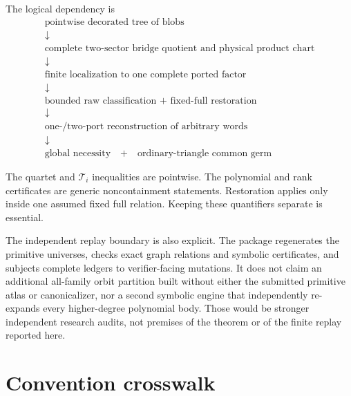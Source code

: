 \documentclass[11pt]{article}
\theoremstyle{remark}
\newcommand{\Ti}{\mathcal T_i}
\begin{document}
The logical dependency is
\[
\begin{array}{c}
\text{pointwise decorated tree of blobs}\\
\downarrow\\
\text{complete two-sector bridge quotient and physical product chart}\\
\downarrow\\
\text{finite localization to one complete ported factor}\\
\downarrow\\
\text{bounded raw classification + fixed-full restoration}\\
\downarrow\\
\text{one-/two-port reconstruction of arbitrary words}\\
\downarrow\\
\text{global necessity}\quad+\quad\text{ordinary-triangle common germ}
\end{array}
\]

The quartet and \(\Ti\) inequalities are pointwise.  The polynomial and rank
certificates are generic noncontainment statements.  Restoration applies only
inside one assumed fixed full relation.  Keeping these quantifiers separate
is essential.

The independent replay boundary is also explicit.  The package regenerates
the primitive universes, checks exact graph relations and symbolic
certificates, and subjects complete ledgers to verifier-facing mutations.  It
does not claim an additional all-family orbit partition built without either
the submitted primitive atlas or canonicalizer, nor a second symbolic engine
that independently re-expands every higher-degree polynomial body.  Those
would be stronger independent research audits, not premises of the theorem or
of the finite replay reported here.

\section{Convention crosswalk}\label{sec:conventions}
\end{document}
